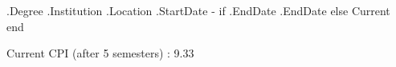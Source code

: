 \cventry
{ {{.Degree}} } %
{ {{.Institution }} } %
{ {{.Location}}} %
{ {{.StartDate}} - {{if .EndDate}} {{.EndDate}} {{else}} Current {{end}}} %
{
    \begin{cvitems} %
        \item {Current CPI (after 5 semesters) : 9.33}
    \end{cvitems}
}